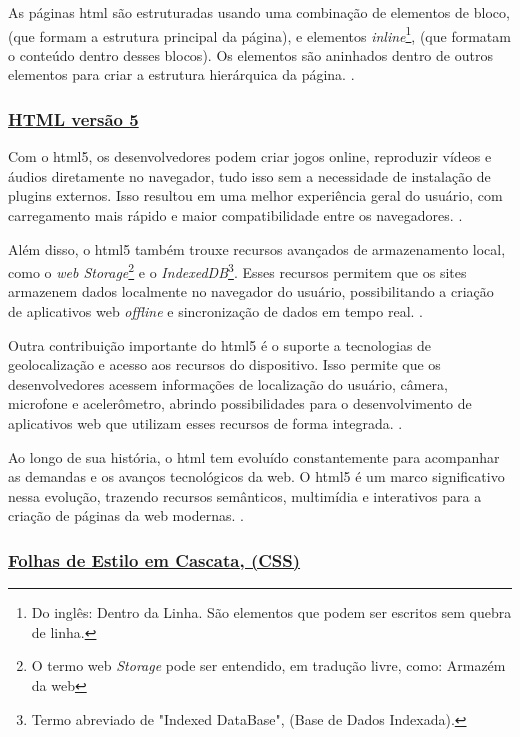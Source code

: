 As páginas
\acrshort{html}
são estruturadas usando uma combinação de elementos de bloco,
(que formam a estrutura principal da página), e elementos
\textit{inline}\footnote{Do inglês: Dentro da Linha. São elementos que podem ser escritos sem quebra de linha.
},
(que formatam o conteúdo
dentro desses blocos). Os elementos são aninhados dentro de outros elementos para criar a
estrutura hierárquica da página.
\cite{w3c}.

\subsubsection{\underline{HTML versão 5}}

Com o
\acrshort{html}5,
os desenvolvedores podem criar jogos online, reproduzir vídeos e
áudios diretamente no navegador, tudo isso sem a necessidade de instalação de plugins
externos. Isso resultou em uma melhor experiência geral do usuário, com carregamento mais
rápido e maior compatibilidade entre os navegadores.
\cite{w3c}.

Além disso, o
\acrshort{html}5
também trouxe recursos avançados de armazenamento local,
como o
\textit{\acrshort{web} Storage}\footnote{O termo
    \acrshort{web} \textit{Storage} pode ser entendido, em tradução
    livre, como: Armazém da \acrshort{web}
}
e o
\textit{IndexedDB}\footnote{Termo abreviado de "Indexed DataBase", (Base de Dados Indexada).
}.
Esses recursos permitem que os sites armazenem dados
localmente no navegador do usuário, possibilitando a criação de aplicativos web
\textit{offline}
e
sincronização de dados em tempo real.
\cite{w3c}.

Outra contribuição importante do
\acrshort{html}5
é o suporte a tecnologias de
geolocalização e acesso aos recursos do dispositivo. Isso permite que os desenvolvedores
acessem informações de localização do usuário, câmera, microfone e acelerômetro, abrindo
possibilidades para o desenvolvimento de aplicativos web que utilizam esses recursos de
forma integrada.
\cite{w3c}.

Ao longo de sua história, o
\acrshort{html}
tem evoluído constantemente para acompanhar as
demandas e os avanços tecnológicos da web. O
\acrshort{html}5
é um marco significativo nessa
evolução, trazendo recursos semânticos, multimídia e interativos para a criação de páginas da
web modernas.
\cite{w3c}.

\subsubsection{\underline{Folhas de Estilo em Cascata, (CSS)}}

